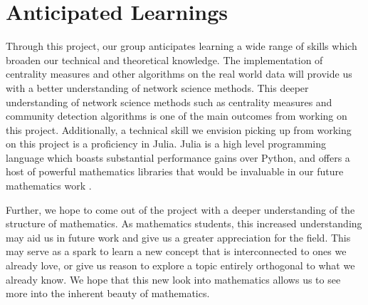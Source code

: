 \documentclass[10pt]{paper}
\begin{document}
\section{Anticipated Learnings}
Through this project, our group anticipates learning a wide range of skills which broaden our technical and theoretical knowledge. 
The implementation of centrality measures and other algorithms on the real world data will provide us with a better understanding of network science methods. 
This deeper understanding of network science methods such as centrality measures and community detection algorithms is one of the main outcomes from working on this project. 
Additionally, a technical skill we envision picking up from working on this project is a proficiency in Julia. 
Julia is a high level programming language \cite{bezanson2017julia} which boasts substantial performance gains over Python, and offers a host of powerful mathematics libraries that would be invaluable in our future mathematics work \cite{arya2022automatic,besard2018juliagpu,besard2019prototyping,JSSv107i04, cranmerInterpretableMachineLearning2023, cranmerDiscovering2020, 10.1145/3511528.3511535,Flux.jl-2018,innes:2018, NetworkDynamics.jl-2021, DifferentialEquations.jl-2017, OceananigansJOSS}.

Further, we hope to come out of the project with a deeper understanding of the structure of mathematics. As mathematics students, this increased understanding may aid us in future work and give us a greater appreciation for the field. 
This may serve as a spark to learn a new concept that is interconnected to ones we already love, or give us reason to explore a topic entirely orthogonal to what we already know. We hope that this new look into mathematics allows us to see more into the inherent beauty of mathematics. 

\newpage 
\printbibliography
\end{document}
